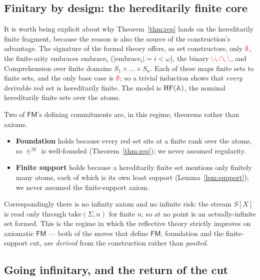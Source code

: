 \subsection{Finitary by design: the hereditarily finite core}
\label{sec:fmmodel:finitary}

It is worth being explicit about why Theorem~\ref{thm:rep} lands on the
hereditarily finite fragment, because the reason is also the source of the
construction's advantage. The signature of the formal theory offers, as set
constructors, only $\textcolor{red}{\emptyset}$, the finite-arity embraces $\mathrm{embrace}_i$
($|\mathrm{embrace}_i| = i < \omega$), the binary $\mathbin{\textcolor{red}{\cup}},\mathbin{\textcolor{red}{\cap}},\mathbin{\textcolor{red}{\setminus}}$, and
$\mathrm{Comprehension}$ over finite domains $S_1\times\dots\times S_n$. Each of
these maps finite sets to finite sets, and the only base case is $\textcolor{red}{\emptyset}$;
so a trivial induction shows that \emph{every} derivable red set is hereditarily
finite. The model is $\mathrm{HF}(\mathbb{A})$, the nominal hereditarily finite sets
over the atoms.

Two of $\mathsf{FM}$'s defining commitments are, in this regime, theorems rather
than axioms.
\begin{itemize}
\item \textbf{Foundation} holds because every red set sits at a finite rank over
  the atoms, so $\in^{\mathcal{M}}$ is well-founded (Theorem~\ref{thm:rep}); we
  never assumed regularity.
\item \textbf{Finite support} holds because a hereditarily finite set mentions
  only finitely many atoms, each of which is its own least support
  (Lemma~\ref{lem:support}); we never assumed the finite-support axiom.
\end{itemize}
Correspondingly there is no infinity axiom and no infinite risk: the stream
$S[X]$ is read only through $\mathrm{take}(\Sigma,n)$ for finite $n$, so at no
point is an actually-infinite set formed. This is the regime in which the
reflective theory strictly improves on axiomatic $\mathsf{FM}$ --- both of the
moves that define $\mathsf{FM}$, foundation and the finite-support cut, are
\emph{derived} from the construction rather than \emph{posited}.

\subsection{Going infinitary, and the return of the cut}
\label{sec:fmmodel:infinitary}

